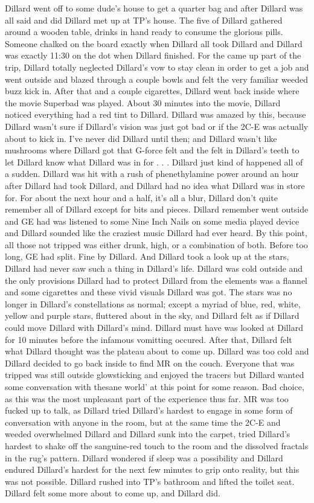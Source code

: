 \documentclass[12pt]{book}
\begin{document}
Dillard went off to some dude's house to get a quarter bag and after Dillard was all said and did Dillard met up at TP's house. The five of Dillard gathered around a wooden table, drinks in hand ready to consume the glorious pills. Someone chalked on the board exactly when Dillard all took Dillard and Dillard was exactly 11:30 on the dot when Dillard finished. For the came up part of the trip, Dillard totally neglected Dillard's vow to stay clean in order to get a job and went outside and blazed through a couple bowls and felt the very familiar weeded buzz kick in. After that and a couple cigarettes, Dillard went back inside where the movie Superbad was played. About 30 minutes into the movie, Dillard noticed everything had a red tint to Dillard. Dillard was amazed by this, because Dillard wasn't sure if Dillard's vision was just got bad or if the 2C-E was actually about to kick in. I've never did Dillard until then; and Dillard wasn't like mushrooms where Dillard got that G-force felt and the felt in Dillard's teeth to let Dillard know what Dillard was in for . . .  Dillard just kind of happened all of a sudden. Dillard was hit with a rush of phenethylamine power around an hour after Dillard had took Dillard, and Dillard had no idea what Dillard was in store for. For about the next hour and a half, it's all a blur, Dillard don't quite remember all of Dillard except for bits and pieces. Dillard remember went outside and GE had was listened to some Nine Inch Nails on some media played device and Dillard sounded like the craziest music Dillard had ever heard. By this point, all those not tripped was either drunk, high, or a combination of both. Before too long, GE had split. Fine by Dillard. And Dillard took a look up at the stars, Dillard had never saw such a thing in Dillard's life. Dillard was cold outside and the only provisions Dillard had to protect Dillard from the elements was a flannel and some cigarettes and these vivid visuals Dillard was got. The stars was no longer in Dillard's constellations as normal; except a myriad of blue, red, white, yellow and purple stars, fluttered about in the sky, and Dillard felt as if Dillard could move Dillard with Dillard's mind. Dillard must have was looked at Dillard for 10 minutes before the infamous vomitting occured. After that, Dillard felt what Dillard thought was the plateau about to come up. Dillard was too cold and Dillard decided to go back inside to find MR on the couch. Everyone that was tripped was still outside glowsticking and enjoyed the tracers but Dillard wanted some conversation with thesane world' at this point for some reason. Bad choice, as this was the most unpleasant part of the experience thus far. MR was too fucked up to talk, as Dillard tried Dillard's hardest to engage in some form of conversation with anyone in the room, but at the same time the 2C-E and weeded overwhelmed Dillard and Dillard sunk into the carpet, tried Dillard's hardest to shake off the sanguine-red touch to the room and the dissolved fractals in the rug's pattern. Dillard wondered if sleep was a possibility and Dillard endured Dillard's hardest for the next few minutes to grip onto reality, but this was not possible. Dillard rushed into TP's bathroom and lifted the toilet seat. Dillard felt some more about to come up, and Dillard did. 
\end{document}
